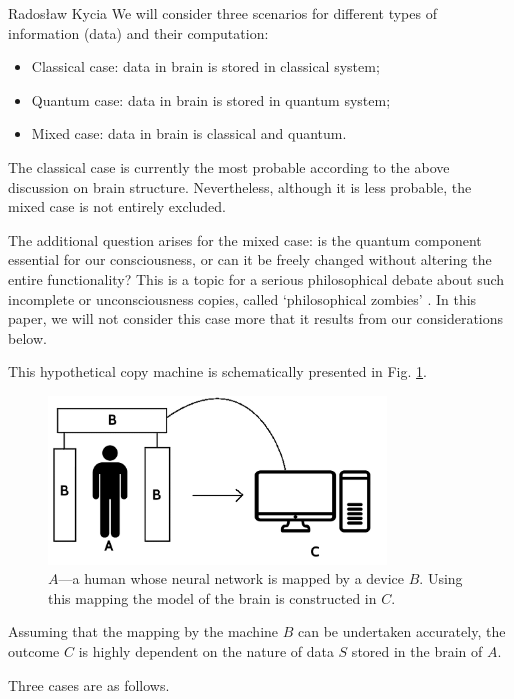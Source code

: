 \begin{artengenv}{Radosław Kycia}
We will consider three scenarios for different types of information (data) and their computation:
\begin{itemize}
 \item {Classical case: data in brain is stored in classical system;}
 \item {Quantum case: data in brain is stored in quantum system;}
 \item {Mixed case: data in brain is classical and quantum.}
\end{itemize}

The classical case is currently the most probable according to the above discussion on brain structure. Nevertheless, although it is less probable, the mixed case is not entirely excluded.

The additional question arises for the mixed case: is the quantum component essential for our consciousness, or can it be freely changed without altering the entire functionality? This is a topic for a serious philosophical debate about such incomplete or unconsciousness copies, called `philosophical zombies' \parencite[see, e.g.][]{pZombie}. In this paper, we will not consider this case more that it results from our considerations below.

This hypothetical copy machine is schematically presented in Fig. \ref{Fig.BrainTransfer}.
\begin{figure}
\centering
 \includegraphics[width=0.8\textwidth]{kycia/BrainTransfer2.png}
 \caption{$A$---a human whose neural network is mapped by a device $B$. Using this mapping the model of the brain is constructed in $C$.}
 \label{Fig.BrainTransfer}
\end{figure}
Assuming that the mapping by the machine $B$ can be undertaken accurately, the outcome $C$ is highly dependent on the nature of data $S$ stored in the brain of $A$. 

Three cases are as follows.



\end{artengenv}
